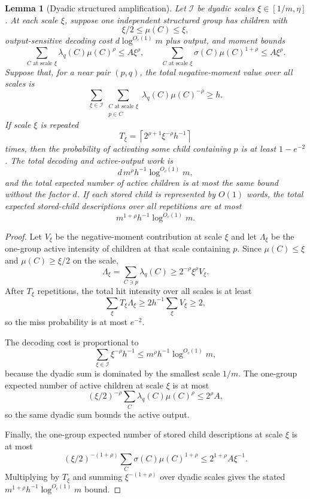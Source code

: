 \documentclass[10pt]{article}
\newtheorem{lemma}[theorem]{Lemma}
\theoremstyle{definition}
\begin{document}
\begin{lemma}[Dyadic structured amplification]\label{lem:dyadic-structured-amplification}
   Let $\mathcal I$ be dyadic scales $\xi\in[1/m,\eta]$. At each scale $\xi$, suppose one independent structured group has children with
   \[
      \xi/2\le\mu(C)\le\xi,
   \]
   output-sensitive decoding cost $d\log^{O_c(1)}m$ plus output, and moment bounds
   \[
      \sum_{C\text{ at scale }\xi}\lambda_q(C)\mu(C)^\rho
      \le A\xi^\rho,
      \qquad
      \sum_{C\text{ at scale }\xi}\sigma(C)\mu(C)^{1+\rho}
      \le A\xi^\rho .
   \]
   Suppose that, for a near pair $(p,q)$, the total negative-moment value over all scales is
   \[
      \sum_{\xi\in\mathcal I}
      \sum_{\substack{C\text{ at scale }\xi\\p\in C}}
      \lambda_q(C)\mu(C)^{-\rho}
      \ge h .
   \]
   If scale $\xi$ is repeated
   \[
      T_\xi=\left\lceil 2^{\rho+1}\xi^{-\rho}h^{-1}\right\rceil
   \]
   times, then the probability of activating some child containing $p$ is at least $1-e^{-2}$. The total decoding and active-output work is
   \[
      d\,m^\rho h^{-1}\log^{O_c(1)}m,
   \]
   and the total expected number of active children is at most the same bound without the factor $d$. If each stored child is represented by $O(1)$ words, the total expected stored-child descriptions over all repetitions are at most
   \[
      m^{1+\rho}h^{-1}\log^{O_c(1)}m.
   \]
\end{lemma}

\begin{proof}
   Let $V_\xi$ be the negative-moment contribution at scale $\xi$ and let $\Lambda_\xi$ be the one-group active intensity of children at that scale containing $p$. Since $\mu(C)\le\xi$ and $\mu(C)\ge\xi/2$ on the scale,
   \[
      \Lambda_\xi
      =
      \sum_{C\ni p}\lambda_q(C)
      \ge
      2^{-\rho}\xi^\rho V_\xi .
   \]
   After $T_\xi$ repetitions, the total hit intensity over all scales is at least
   \[
      \sum_\xi T_\xi\Lambda_\xi
      \ge
      2h^{-1}\sum_\xi V_\xi
      \ge2,
   \]
   so the miss probability is at most $e^{-2}$.

   The decoding cost is proportional to
   \[
      \sum_{\xi\in\mathcal I}\xi^{-\rho}h^{-1}
      \le
      m^\rho h^{-1}\log^{O_c(1)}m,
   \]
   because the dyadic sum is dominated by the smallest scale $1/m$. The one-group expected number of active children at scale $\xi$ is at most
   \[
      (\xi/2)^{-\rho}\sum_C\lambda_q(C)\mu(C)^\rho
      \le
      2^\rho A,
   \]
   so the same dyadic sum bounds the active output.

   Finally, the one-group expected number of stored child descriptions at scale $\xi$ is at most
   \[
      (\xi/2)^{-(1+\rho)}
      \sum_C\sigma(C)\mu(C)^{1+\rho}
      \le
      2^{1+\rho}A\xi^{-1}.
   \]
   Multiplying by $T_\xi$ and summing $\xi^{-(1+\rho)}$ over dyadic scales gives the stated $m^{1+\rho}h^{-1}\log^{O_c(1)}m$ bound.
\end{proof}
\end{document}
